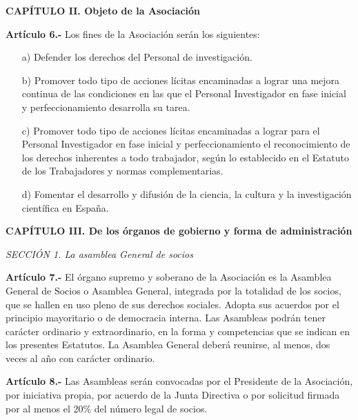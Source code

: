\documentclass[a4paper,12pt]{article}
\begin{document}
\begin{onehalfspace}
\bigskip\bigskip

\begin{center}
\textbf{CAPÍTULO II. Objeto de la Asociación}
\end{center}

\bigskip\bigskip

\textbf{Artículo 6.-} Los fines de la Asociación serán los siguientes:
\begin{itemize}
\item [a)] Defender los derechos del Personal de investigación.
\item [b)] Promover todo tipo de acciones lícitas encaminadas a lograr una mejora continua de las condiciones en las que el Personal Investigador en fase inicial y perfeccionamiento desarrolla su tarea.
\item [c)] Promover todo tipo de acciones lícitas encaminadas a lograr para el Personal Investigador en fase inicial y perfeccionamiento el reconocimiento de los derechos inherentes a todo trabajador, según lo establecido en el Estatuto de  los Trabajadores y normas complementarias.
\item [d)] Fomentar el desarrollo y difusión de la ciencia, la cultura y la investigación científica en España.
\end{itemize}

\bigskip\bigskip
\begin{center}
\textbf{CAPÍTULO III. De los órganos de gobierno y forma de administración}
\end{center}

\bigskip\bigskip

\textit{SECCIÓN 1\textordfeminine. La asamblea General de socios}

\bigskip\bigskip

\textbf{Artículo 7.-} El órgano supremo y soberano de la Asociación es la Asamblea General de Socios o Asamblea General, integrada por la totalidad de los socios, que se hallen en uso pleno de sus derechos sociales. Adopta sus acuerdos por el principio mayoritario o de democracia interna. Las Asambleas podrán tener carácter ordinario y extraordinario, en la forma y competencias que se indican en los presentes Estatutos. La Asamblea General deberá reunirse, al menos, dos veces al año con carácter ordinario.

\bigskip\bigskip

\textbf{Artículo 8.-} Las Asambleas serán convocadas por el Presidente de la Asociación, por iniciativa propia, por acuerdo de la Junta Directiva o por solicitud firmada por al menos el 20\% del número legal de socios.


\end{onehalfspace}
\end{document}
